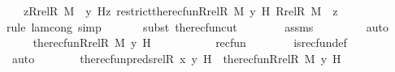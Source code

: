 \begin{isabellebody}
\ {\isachardoublequoteopen}{\isachardot}{\kern0pt}{\isachardot}{\kern0pt}{\isachardot}{\kern0pt}\ {\isacharequal}{\kern0pt}\ {\isacharparenleft}{\kern0pt}{\isasymlambda}z{\isasymin}Rrel{\isacharparenleft}{\kern0pt}R{\isacharcomma}{\kern0pt}\ M{\isacharparenright}{\kern0pt}\ {\isacharminus}{\kern0pt}{\isacharbackquote}{\kern0pt}{\isacharbackquote}{\kern0pt}\ {\isacharbraceleft}{\kern0pt}y{\isacharbraceright}{\kern0pt}{\isachardot}{\kern0pt}\ H{\isacharparenleft}{\kern0pt}z{\isacharcomma}{\kern0pt}\ restrict{\isacharparenleft}{\kern0pt}the{\isacharunderscore}{\kern0pt}recfun{\isacharparenleft}{\kern0pt}Rrel{\isacharparenleft}{\kern0pt}R{\isacharcomma}{\kern0pt}\ M{\isacharparenright}{\kern0pt}{\isacharcomma}{\kern0pt}\ y{\isacharcomma}{\kern0pt}\ H{\isacharparenright}{\kern0pt}{\isacharcomma}{\kern0pt}\ Rrel{\isacharparenleft}{\kern0pt}R{\isacharcomma}{\kern0pt}\ M{\isacharparenright}{\kern0pt}\ {\isacharminus}{\kern0pt}{\isacharbackquote}{\kern0pt}{\isacharbackquote}{\kern0pt}\ {\isacharbraceleft}{\kern0pt}z{\isacharbraceright}{\kern0pt}{\isacharparenright}{\kern0pt}{\isacharparenright}{\kern0pt}{\isacharparenright}{\kern0pt}{\isachardoublequoteclose}\isanewline
\ \ \ \ \ \ \isamarkupfalse%
{\isacharparenleft}{\kern0pt}rule\ lam{\isacharunderscore}{\kern0pt}cong{\isacharcomma}{\kern0pt}\ simp{\isacharparenright}{\kern0pt}\isanewline
\ \ \ \ \ \ \isamarkupfalse%
{\isacharparenleft}{\kern0pt}subst\ the{\isacharunderscore}{\kern0pt}recfun{\isacharunderscore}{\kern0pt}cut{\isacharparenright}{\kern0pt}\isanewline
\ \ \ \ \ \ \isamarkupfalse%
\ assms\ \isanewline
\ \ \ \ \ \ \isamarkupfalse%
\ auto\isanewline
\ \ \ \ \isamarkupfalse%
\ \isamarkupfalse%
\ {\isachardoublequoteopen}{\isachardot}{\kern0pt}{\isachardot}{\kern0pt}{\isachardot}{\kern0pt}\ {\isacharequal}{\kern0pt}\ the{\isacharunderscore}{\kern0pt}recfun{\isacharparenleft}{\kern0pt}Rrel{\isacharparenleft}{\kern0pt}R{\isacharcomma}{\kern0pt}\ M{\isacharparenright}{\kern0pt}{\isacharcomma}{\kern0pt}\ y{\isacharcomma}{\kern0pt}\ H{\isacharparenright}{\kern0pt}{\isachardoublequoteclose}\ \ \ \isanewline
\ \ \ \ \ \ \isamarkupfalse%
\ recfun{\isacharprime}{\kern0pt}\isanewline
\ \ \ \ \ \ \isamarkupfalse%
\ is{\isacharunderscore}{\kern0pt}recfun{\isacharunderscore}{\kern0pt}def\isanewline
\ \ \ \ \ \ \isamarkupfalse%
\ auto\isanewline
\ \ \ \ \isamarkupfalse%
\ \isamarkupfalse%
\ {\isachardoublequoteopen}the{\isacharunderscore}{\kern0pt}recfun{\isacharparenleft}{\kern0pt}preds{\isacharunderscore}{\kern0pt}rel{\isacharparenleft}{\kern0pt}R{\isacharcomma}{\kern0pt}\ x{\isacharparenright}{\kern0pt}{\isacharcomma}{\kern0pt}\ y{\isacharcomma}{\kern0pt}\ H{\isacharparenright}{\kern0pt}\ {\isacharequal}{\kern0pt}\ the{\isacharunderscore}{\kern0pt}recfun{\isacharparenleft}{\kern0pt}Rrel{\isacharparenleft}{\kern0pt}R{\isacharcomma}{\kern0pt}\ M{\isacharparenright}{\kern0pt}{\isacharcomma}{\kern0pt}\ y{\isacharcomma}{\kern0pt}\ H{\isacharparenright}{\kern0pt}{\isachardoublequoteclose}\ \isamarkupfalse%

\end{isabellebody}
